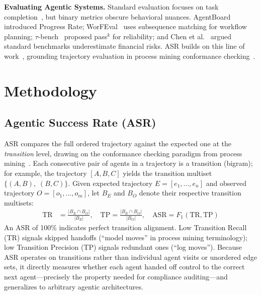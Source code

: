 \documentclass[runningheads]{llncs}
\begin{document}
\noindent\textbf{Evaluating Agentic Systems.}
Standard evaluation focuses on task completion~\cite{liu2023agentbench,kapoor2024ai}, but binary metrics obscure behavioral nuances. AgentBoard~\cite{agentboard2024} introduced Progress Rate; WorFEval~\cite{worfeval2025} uses subsequence matching for workflow planning; $\tau$-bench~\cite{taubench2024} proposed pass$^k$ for reliability; and Chen et al.~\cite{chen2025benchmarksfail} argued standard benchmarks underestimate financial risks. ASR builds on this line of work~\cite{mohammadi2025agenteval}, grounding trajectory evaluation in process mining conformance checking~\cite{vanderaalst2012conformance,carmona2018conformance}.%

\section{Methodology}



\subsection{Agentic Success Rate (ASR)}

ASR compares the full ordered trajectory against the expected one at the \emph{transition} level, drawing on the conformance checking paradigm from process mining~\cite{vanderaalst2012conformance,carmona2018conformance}. Each consecutive pair of agents in a trajectory is a transition (bigram); for example, the trajectory $[A, B, C]$ yields the transition multiset $\{(A{,}B),\;(B{,}C)\}$. Given expected trajectory $E = [e_1, \ldots, e_n]$ and observed trajectory $O = [o_1, \ldots, o_m]$, let $B_E$ and $B_O$ denote their respective transition multisets:
%
\begin{align}
\text{TR} &= \frac{|B_E \cap B_O|}{|B_E|}, \quad
\text{TP} = \frac{|B_E \cap B_O|}{|B_O|}, \quad
\text{ASR} = F_1(\text{TR}, \text{TP})
\end{align}
%
An ASR of 100\% indicates perfect transition alignment. Low Transition Recall (TR) signals skipped handoffs (``model moves'' in process mining terminology); low Transition Precision (TP) signals redundant ones (``log moves''). Because ASR operates on transitions rather than individual agent visits or unordered edge sets, it directly measures whether each agent handed off control to the correct next agent---precisely the property needed for compliance auditing---and generalizes to arbitrary agentic architectures.
\end{document}
